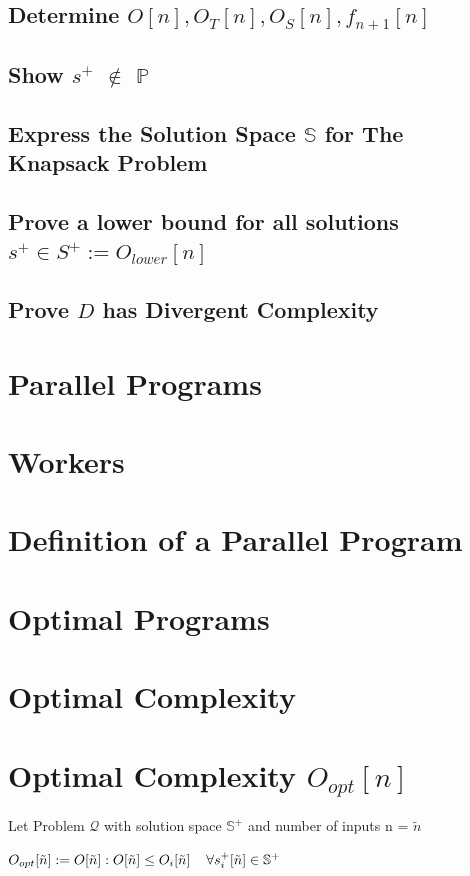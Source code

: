\documentclass[11pt]{article}
\begin{document}
\subsection{Determine $O[n],O_T[n],O_S[n],f_{n+1}[n]$}
\subsection{Show $s^+$ $\notin$ $\mathbb{P}$}
\subsection{Express the Solution Space $\mathbb{S}$ for The Knapsack Problem}
\subsection{Prove a lower bound for all solutions $s^+ \in S^+ := O_{lower}[n]$}
\subsection{Prove $D$ has Divergent Complexity}





\newpage

\section*{Parallel Programs}
\section{Workers}
\section{Definition of a Parallel Program}

\newpage

\section*{Optimal Programs}
\section{Optimal Complexity}

\section{Optimal Complexity $O_{opt}[n]$}
Let Problem $\mathcal{Q}$ with solution space $\mathbb{S}^+$ and number of inputs n = $\tilde{n}$
\begin{center}
$
O_{opt}[\tilde{n}] := O[\tilde{n}] : O[\tilde{n}] \leq O_i[\tilde{n}] \hspace{4mm} \forall s_i^+[\tilde{n}] \in \mathbb{S}^+
$
\end{center}
\end{document}
